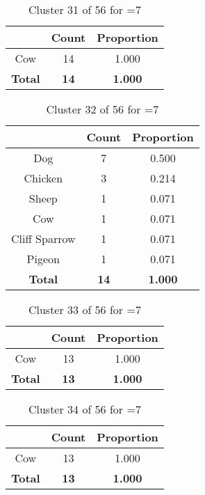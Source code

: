 \begin{table}[ht!]
\centering
\begin{tabular}{|c|c|c|}
\hline
\bf \Spec{} &\bf Count &\bf Proportion\\ \hline \hline
Cow & 14 & 1.000\\ \hline
\hline
\bf Total & \bf 14 & \bf 1.000\\ \hline
\end{tabular}
\label{tab:cluster:31:7}
\caption{Cluster 31 of 56 for \minneigh{}=7}
\end{table}

\begin{table}[ht!]
\centering
\begin{tabular}{|c|c|c|}
\hline
\bf \Spec{} &\bf Count &\bf Proportion\\ \hline \hline
Dog & 7 & 0.500\\ \hline
Chicken & 3 & 0.214\\ \hline
Sheep & 1 & 0.071\\ \hline
Cow & 1 & 0.071\\ \hline
Cliff Sparrow & 1 & 0.071\\ \hline
Pigeon & 1 & 0.071\\ \hline
\hline
\bf Total & \bf 14 & \bf 1.000\\ \hline
\end{tabular}
\label{tab:cluster:32:7}
\caption{Cluster 32 of 56 for \minneigh{}=7}
\end{table}

\begin{table}[ht!]
\centering
\begin{tabular}{|c|c|c|}
\hline
\bf \Spec{} &\bf Count &\bf Proportion\\ \hline \hline
Cow & 13 & 1.000\\ \hline
\hline
\bf Total & \bf 13 & \bf 1.000\\ \hline
\end{tabular}
\label{tab:cluster:33:7}
\caption{Cluster 33 of 56 for \minneigh{}=7}
\end{table}

\begin{table}[ht!]
\centering
\begin{tabular}{|c|c|c|}
\hline
\bf \Spec{} &\bf Count &\bf Proportion\\ \hline \hline
Cow & 13 & 1.000\\ \hline
\hline
\bf Total & \bf 13 & \bf 1.000\\ \hline
\end{tabular}
\label{tab:cluster:34:7}
\caption{Cluster 34 of 56 for \minneigh{}=7}
\end{table}

